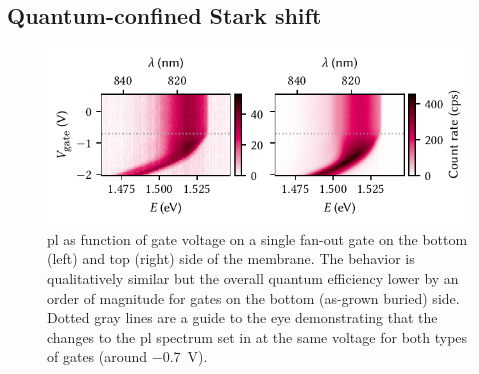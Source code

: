 \subsection{Quantum-confined Stark shift}\label{subsec:exp:observations:pl:qcse}

\begin{figure}
    \centering
    \includegraphics{img/pdf/experiment/honey_H13_stark_shift_vs_gate}
    \caption[
        \protect\newline
    ]{
        \Gls{pl} as function of gate voltage on a single fan-out gate on the bottom (left) and top (right) side of the membrane.
        The behavior is qualitatively similar but the overall quantum efficiency lower by an order of magnitude for gates on the bottom (as-grown buried) side.
        Dotted gray lines are a guide to the eye demonstrating that the changes to the \gls{pl} spectrum set in at the same voltage for both types of gates (around \qty{-0.7}{\volt}).
    }
    \label{fig:exp:pl:honey_H13_stark_shift_vs_gate}
\end{figure}

